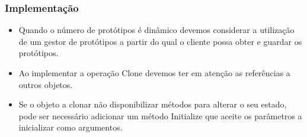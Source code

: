 \subsubsection{Implementação}
\begin{itemize}
\item Quando o número de protótipos é dinâmico devemos considerar a utilização de um gestor de protótipos a partir do qual o cliente possa obter e guardar os protótipos.
\item Ao implementar a operação Clone devemos ter em atenção as referências a outros objetos.
\item Se o objeto a clonar não disponibilizar métodos para alterar o seu estado, pode ser necessário adicionar um método Initialize que aceite os parâmetros a inicializar como argumentos.
\end{itemize}